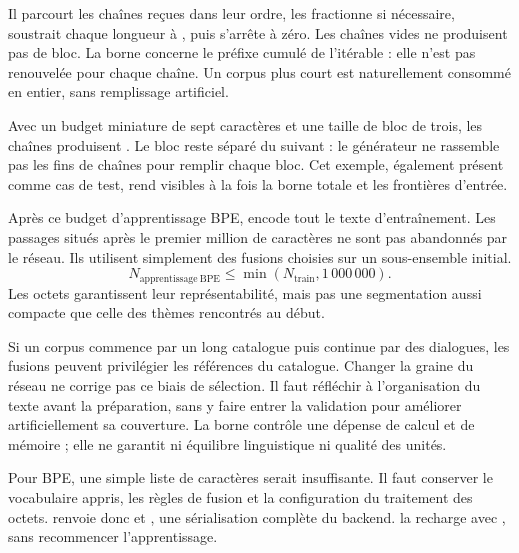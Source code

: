 Il parcourt les chaînes reçues dans leur ordre, les fractionne si nécessaire,
soustrait chaque longueur à , puis s'arrête à zéro.
Les chaînes vides ne produisent pas de bloc.
La borne concerne le préfixe cumulé de l'itérable : elle n'est pas renouvelée
pour chaque chaîne. Un corpus plus court est naturellement consommé en entier,
sans remplissage artificiel.

Avec un budget miniature de sept caractères et une taille de bloc de trois,
les chaînes  produisent
. Le bloc  reste séparé du suivant :
le générateur ne rassemble pas les fins de chaînes pour remplir chaque bloc.
Cet exemple, également présent comme cas de test, rend visibles à la fois
la borne totale et les frontières d'entrée.

Après ce budget d'apprentissage BPE,  encode tout
le texte d'entraînement. Les passages situés après le premier million
de caractères ne sont pas abandonnés par le réseau. Ils utilisent simplement
des fusions choisies sur un sous-ensemble initial.
\[
    N_{\mathrm{apprentissage\ BPE}}
    \leq \min(N_{\mathrm{train}},1\,000\,000).
\]
Les octets garantissent leur représentabilité, mais pas une segmentation
aussi compacte que celle des thèmes rencontrés au début.

Si un corpus commence par un long catalogue puis continue par des dialogues,
les fusions peuvent privilégier les références du catalogue.
Changer la graine du réseau ne corrige pas ce biais de sélection.
Il faut réfléchir à l'organisation du texte avant la préparation,
sans y faire entrer la validation pour améliorer artificiellement sa couverture.
La borne contrôle une dépense de calcul et de mémoire ; elle ne garantit
ni équilibre linguistique ni qualité des unités.


Pour BPE, une simple liste de caractères serait insuffisante. Il faut conserver
le vocabulaire appris, les règles de fusion et la configuration du traitement
des octets.  renvoie donc
 et , une sérialisation complète
du backend.  la recharge avec
, sans recommencer l'apprentissage.

